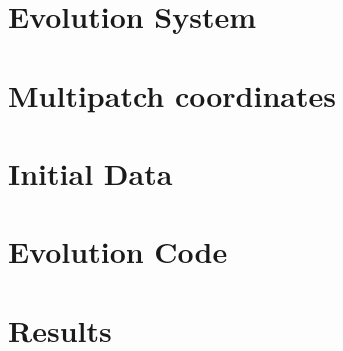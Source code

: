 

\section{Evolution System}
\label{ch:wave_scattering:sec:system}


\section{Multipatch coordinates}
\label{ch:wave_scattering:sec:multipatch}


\section{Initial Data}
\label{ch:wave_scattering:sec:id}


\section{Evolution Code}
\label{ch:wave_scattering:sec:code}


\section{Results}
\label{ch:wave_scattering:sec:results}
